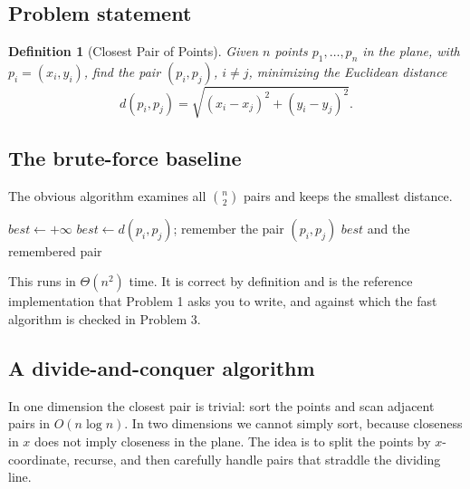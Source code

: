 \documentclass[11pt]{article}
\newtheorem{definition}[theorem]{Definition}
\begin{document}
\subsection{Problem statement}

\begin{definition}[Closest Pair of Points]
Given $n$ points $p_1, \ldots, p_n$ in the plane, with $p_i = (x_i, y_i)$, find the pair
$(p_i, p_j)$, $i \ne j$, minimizing the Euclidean distance
\[
d(p_i, p_j) = \sqrt{(x_i - x_j)^2 + (y_i - y_j)^2}.
\]
\end{definition}

\subsection{The brute-force baseline}

The obvious algorithm examines all $\binom{n}{2}$ pairs and keeps the smallest distance.

\begin{algorithm}[h]
\caption{Brute-Force Closest Pair}
\begin{algorithmic}[1]
\State $best \gets +\infty$
            \State $best \gets d(p_i, p_j)$; remember the pair $(p_i, p_j)$
        \EndIf
    \EndFor
\EndFor
\State \Return $best$ and the remembered pair
\end{algorithmic}
\end{algorithm}

This runs in $\Theta(n^2)$ time. It is correct by definition and is the reference
implementation that Problem 1 asks you to write, and against which the fast algorithm is
checked in Problem 3.

\subsection{A divide-and-conquer algorithm}

In one dimension the closest pair is trivial: sort the points and scan adjacent pairs in
$O(n \log n)$. In two dimensions we cannot simply sort, because closeness in $x$ does not
imply closeness in the plane. The idea is to split the points by $x$-coordinate, recurse,
and then carefully handle pairs that straddle the dividing line.
\end{document}
